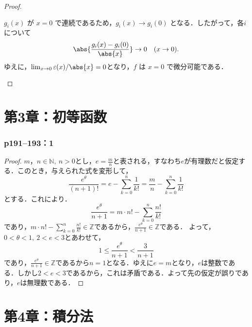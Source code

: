 \documentclass[a4paper,10pt,fleqn]{ltjsarticle}
\begin{document}
\begin{tleftbar}
\begin{proof}
\begin{description}
                  $ g_i(x) $ が $ x=0 $ で連続であるため，$ g_i(x) \to g_i(0) $ となる．したがって，各$ i $について
                  \[
                      \abs{ \frac{g_i(x) - g_i(0)}{\abs{x}} } \to 0 \quad (x \to 0).
                  \]
                  ゆえに，$\lim_{x \to 0} \varepsilon(x)/\abs{x} = 0$となり，$ f $ は $ x=0 $ で微分可能である．
        \end{description}
    \end{proof}
\end{tleftbar}

\part*{第3章：初等函数}


\section*{p191--193：1}


\begin{tleftbar}
    \begin{proof}
        $m，n \in \mathbb{N},~n >0$とし，$e=\frac{m}{n}$と表される，すなわち$e$が有理数だと仮定する．このとき，与えられた式を変形して，
        \[
            \frac{e^\theta}{(n+1)!} = e-\sum_{k=0}^{n} \frac{1}{k!} =\frac{m}{n}-\sum_{k=0}^{n} \frac{1}{k!}
        \]
        とする．これにより．
        \[
            \frac{e^{\theta}}{n+1} = m \cdot n! - \sum_{k=0}^{n} \frac{n!}{k!}
        \]
        であり，$m \cdot n! - \sum_{k=0}^{n} \frac{n!}{k!} \in \mathbb{Z}$であるから，$\frac{e^{\theta}}{n+1} \in \mathbb{Z}$である．
        よって，$0< \theta <1,~2<e<3$とあわせて，
        \[
            1 \le \frac{e^{\theta}}{n+1} < \frac{3}{n+1}
        \]
        であり，$\frac{e^{\theta}}{n+1} \in \mathbb{Z}$であるから$n=1$となる．ゆえに$e=m$となり，$e$は整数である．しかし$2<e<3$であるから，これは矛盾である．よって先の仮定が誤りであり，$e$は無理数である．
    \end{proof}
\end{tleftbar}
\newpage

\part*{第4章：積分法}
\end{document}
